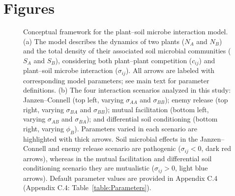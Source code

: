 \clearpage
\section{Figures}
\begin{figure}[h!]
	\centering
	\caption[Conceptual framework for the plant--soil microbe interaction model.]
		{\hspace{1mm}Conceptual framework for the plant--soil microbe interaction model. (a) The model describes the dynamics of two plants (\textit{$N_{A}$} and \textit{$N_{B}$}) and the total density of their associated soil microbial communities (\textit{$S_{A}$} and \textit{$S_{B}$}), considering both plant--plant competition ($c_{ij}$) and plant--soil microbe interaction ($\sigma_{ij}$).  All arrows are labeled with corresponding model parameters; see main text for parameter definitions. (b) The four interaction scenarios analyzed in this study: Janzen--Connell (top left, varying $\sigma_{AA}$ and $\sigma_{BB}$); enemy release (top right, varying $\sigma_{BA}$ and $\sigma_{BB}$); mutual facilitation (bottom left, varying $\sigma_{AB}$ and  $\sigma_{BA}$); and differential soil conditioning (bottom right, varying $\phi_{B}$). Parameters varied in each scenario are highlighted with thick arrows. Soil microbial effects in the Janzen--Connell and enemy release scenario are pathogenic ($\sigma_{ij}<0$, dark red arrows), whereas in the mutual facilitation and differential soil conditioning scenario they are mutualistic ($\sigma_{ij}>0$, light blue arrows). Default parameter values are provided in Appendix C.4 (Appendix C.4: Table~\ref{table:Parameters}).}
	\label{fig:Framework}
\end{figure}




